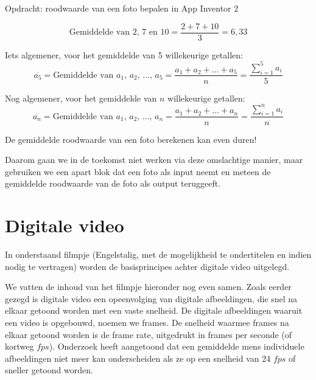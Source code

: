 \begin{opdracht}{Opdracht: roodwaarde van een foto bepalen in App Inventor 2}
\begin{enumerate}
	\begin{equation*}
	\text{Gemiddelde van 2, 7 en 10} = \frac{2+7+10}{3} = 6,33
	\end{equation*}

	Iets algemener, voor het gemiddelde van 5 willekeurige getallen:
	\begin{equation*}
	\overline{a_5} = \text{Gemiddelde van $a_1$, $a_2$, ..., $a_5$} = \frac{a_1+a_2+\ldots+a_5}{n} = \frac{\sum_{i=1}^{5} a_i}{5}
	\end{equation*}
	
	Nog algemener, voor het gemiddelde van $n$ willekeurige getallen:
	\begin{equation*}
	\overline{a_n} = \text{Gemiddelde van $a_1$, $a_2$, ..., $a_n$} = \frac{a_1+a_2+\ldots+a_n}{n} = \frac{\sum_{i=1}^{n} a_i}{n}
	\end{equation*}
	
	\begin{opmerking}
		De gemiddelde roodwaarde van een foto berekenen kan even duren!
		
		Daarom gaan we in de toekomst niet werken via deze omslachtige manier, maar gebruiken we een apart blok dat een foto als input neemt en meteen de gemiddelde roodwaarde van de foto als output teruggeeft.
	\end{opmerking}
\end{enumerate}
\end{opdracht}

\section{Digitale video}
\label{sec:Mod3_Sec2}
%

In onderstaand filmpje (Engelstalig, met de mogelijkheid te ondertitelen en indien nodig te vertragen) worden de basisprincipes achter digitale video uitgelegd. 


We vatten de inhoud van het filmpje hieronder nog even samen. Zoals eerder gezegd is digitale video een opeenvolging van digitale afbeeldingen, die snel na elkaar getoond worden met een vaste snelheid.
De digitale afbeeldingen waaruit een video is opgebouwd, noemen we frames.
De snelheid waarmee frames na elkaar getoond worden is de frame rate, uitgedrukt in frames per seconde (of kortweg $fps$).
Onderzoek heeft aangetoond dat een gemiddelde mens individuele afbeeldingen niet meer kan onderscheiden als ze op een snelheid van 24 $fps$ of sneller getoond worden.

